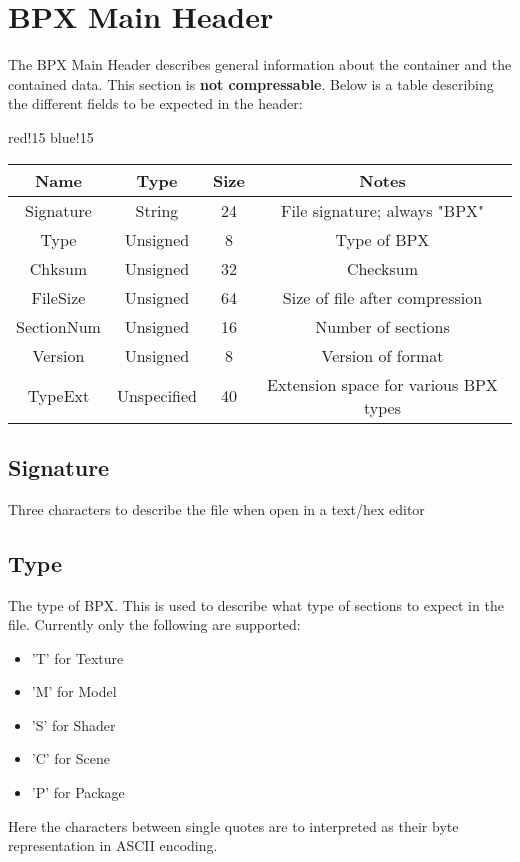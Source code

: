 \section{BPX Main Header}
The BPX Main Header describes general information about the container and the contained data.\newline
This section is \textbf{not compressable}.\newline
Below is a table describing the different fields to be expected in the header:
\begin{center}
    {
        {red!15}
        {blue!15}
        \begin{tabular}{|c|c|c|c|}
            \hline
            \textbf{Name} & \textbf{Type} & \textbf{Size} & \textbf{Notes} \\
    
            \hline\hline
            Signature & String & 24 & File signature; always "BPX" \\
            Type & Unsigned & 8 & Type of BPX \\
            Chksum & Unsigned & 32 & Checksum \\
            FileSize & Unsigned & 64 & Size of file after compression \\
            SectionNum & Unsigned & 16 & Number of sections \\
            Version & Unsigned & 8 & Version of format \\
            TypeExt & Unspecified & 40 & Extension space for various BPX types \\
            \hline
        \end{tabular}
    }
\end{center}

\subsection{Signature}
Three characters to describe the file when open in a text/hex editor

\subsection{Type}
The type of BPX. This is used to describe what type of sections to expect in the file.\newline
Currently only the following are supported:
\begin{itemize}
    \item 'T' for Texture
    \item 'M' for Model
    \item 'S' for Shader
    \item 'C' for Scene
    \item 'P' for Package
\end{itemize}
Here the characters between single quotes are to interpreted as their byte representation in ASCII encoding.

